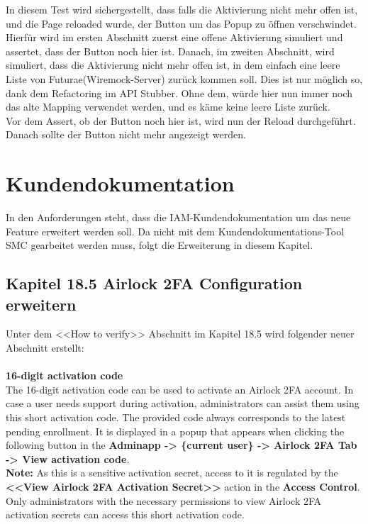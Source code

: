 In diesem Test wird sichergestellt, dass falls die Aktivierung nicht mehr offen ist, und die Page reloaded wurde, der Button um das Popup zu öffnen verschwindet. Hierfür wird im ersten Abschnitt zuerst eine offene Aktivierung simuliert und assertet, dass der Button noch hier ist. Danach, im zweiten Abschnitt, wird simuliert, dass die Aktivierung nicht mehr offen ist, in dem einfach eine leere Liste von Futurae(Wiremock-Server) zurück kommen soll. Dies ist nur möglich so, dank dem Refactoring im API Stubber. Ohne dem, würde hier nun immer noch das alte Mapping verwendet werden, und es käme keine leere Liste zurück.\\ 
Vor dem Assert, ob der Button noch hier ist, wird nun der Reload durchgeführt. Danach sollte der Button nicht mehr angezeigt werden.
\section{Kundendokumentation}
In den Anforderungen steht, dass die IAM-Kundendokumentation um das neue Feature erweitert werden soll. Da nicht mit dem Kundendokumentations-Tool SMC gearbeitet werden muss, folgt die Erweiterung in diesem Kapitel.
\subsection{Kapitel 18.5 Airlock 2FA Configuration erweitern}
Unter dem <<How to verify>> Abschnitt im Kapitel 18.5 wird folgender neuer Abschnitt erstellt:\\\\
\textbf{16-digit activation code}\\
The 16-digit activation code can be used to activate an Airlock 2FA account. In case a user needs support during activation, administrators can assist them using this short activation code. The provided code always corresponds to the latest pending enrollment. It is displayed in a popup that appears when clicking the following button in the \textbf{Adminapp -> \{current user\} -> Airlock 2FA Tab -> View activation code}.\\
\textbf{Note:} As this is a sensitive activation secret, access to it is regulated by the \textbf{<<View Airlock 2FA Activation Secret>>} action in the \textbf{Access Control}. Only administrators with the necessary permissions to view Airlock 2FA activation secrets can access this short activation code.













